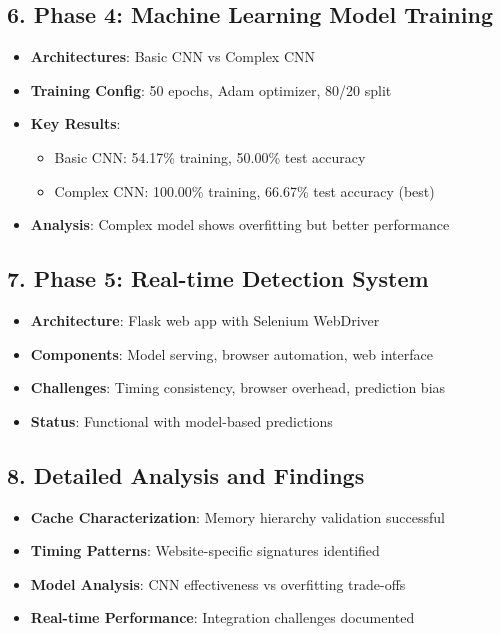 \documentclass[11pt,a4paper]{article}
\begin{document}
\subsection{6. Phase 4: Machine Learning Model Training}
\begin{itemize}[leftmargin=*]
    \item \textbf{Architectures}: Basic CNN vs Complex CNN
    \item \textbf{Training Config}: 50 epochs, Adam optimizer, 80/20 split
    \item \textbf{Key Results}:
    \begin{itemize}
        \item Basic CNN: 54.17\% training, 50.00\% test accuracy
        \item Complex CNN: 100.00\% training, 66.67\% test accuracy (best)
    \end{itemize}
    \item \textbf{Analysis}: Complex model shows overfitting but better performance
\end{itemize}

\subsection{7. Phase 5: Real-time Detection System}
\begin{itemize}[leftmargin=*]
    \item \textbf{Architecture}: Flask web app with Selenium WebDriver
    \item \textbf{Components}: Model serving, browser automation, web interface
    \item \textbf{Challenges}: Timing consistency, browser overhead, prediction bias
    \item \textbf{Status}: Functional with model-based predictions
\end{itemize}

\subsection{8. Detailed Analysis and Findings}
\begin{itemize}[leftmargin=*]
    \item \textbf{Cache Characterization}: Memory hierarchy validation successful
    \item \textbf{Timing Patterns}: Website-specific signatures identified
    \item \textbf{Model Analysis}: CNN effectiveness vs overfitting trade-offs
    \item \textbf{Real-time Performance}: Integration challenges documented
\end{itemize}
\end{document}
